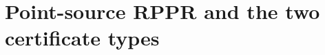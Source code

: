 \documentclass[11pt]{article}
\begin{document}
\tableofcontents



\section{Point-source RPPR and the two certificate types}













\end{document}
